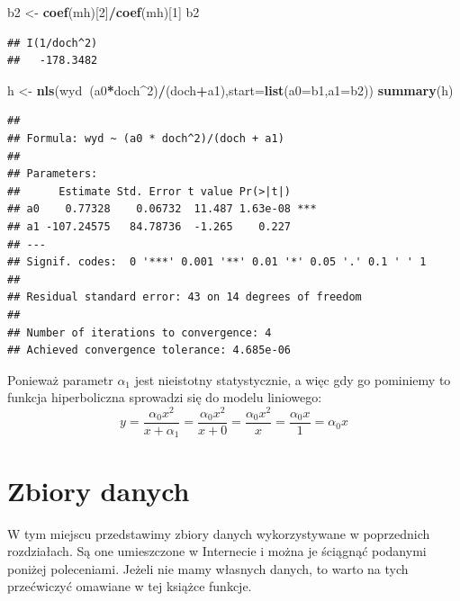 \documentclass[polish,]{book}
\newenvironment{Shaded}{\begin{snugshade}}{\end{snugshade}}
\newcommand{\DataTypeTok}[1]{\textcolor[rgb]{0.13,0.29,0.53}{#1}}
\newcommand{\DecValTok}[1]{\textcolor[rgb]{0.00,0.00,0.81}{#1}}
\newcommand{\KeywordTok}[1]{\textcolor[rgb]{0.13,0.29,0.53}{\textbf{#1}}}
\newcommand{\NormalTok}[1]{#1}
\newcommand{\OperatorTok}[1]{\textcolor[rgb]{0.81,0.36,0.00}{\textbf{#1}}}
\newcommand{\StringTok}[1]{\textcolor[rgb]{0.31,0.60,0.02}{#1}}
\begin{document}
\begin{Shaded}
\begin{Highlighting}[]
\NormalTok{b2 <-}\StringTok{ }\KeywordTok{coef}\NormalTok{(mh)[}\DecValTok{2}\NormalTok{]}\OperatorTok{/}\KeywordTok{coef}\NormalTok{(mh)[}\DecValTok{1}\NormalTok{]}
\NormalTok{b2}
\end{Highlighting}
\end{Shaded}

\begin{verbatim}
## I(1/doch^2) 
##   -178.3482
\end{verbatim}

\begin{Shaded}
\begin{Highlighting}[]
\NormalTok{h <-}\StringTok{ }\KeywordTok{nls}\NormalTok{(wyd}\OperatorTok{~}\NormalTok{(a0}\OperatorTok{*}\NormalTok{doch}\OperatorTok{^}\DecValTok{2}\NormalTok{)}\OperatorTok{/}\NormalTok{(doch}\OperatorTok{+}\NormalTok{a1),}\DataTypeTok{start=}\KeywordTok{list}\NormalTok{(}\DataTypeTok{a0=}\NormalTok{b1,}\DataTypeTok{a1=}\NormalTok{b2))}
\KeywordTok{summary}\NormalTok{(h)}
\end{Highlighting}
\end{Shaded}

\begin{verbatim}
## 
## Formula: wyd ~ (a0 * doch^2)/(doch + a1)
## 
## Parameters:
##      Estimate Std. Error t value Pr(>|t|)    
## a0    0.77328    0.06732  11.487 1.63e-08 ***
## a1 -107.24575   84.78736  -1.265    0.227    
## ---
## Signif. codes:  0 '***' 0.001 '**' 0.01 '*' 0.05 '.' 0.1 ' ' 1
## 
## Residual standard error: 43 on 14 degrees of freedom
## 
## Number of iterations to convergence: 4 
## Achieved convergence tolerance: 4.685e-06
\end{verbatim}

Ponieważ parametr \(\alpha_1\) jest nieistotny statystycznie, a więc gdy go pominiemy to funkcja hiperboliczna sprowadzi się do modelu liniowego:
\[
y=\frac{\alpha_0x^2}{x+\alpha_1}=\frac{\alpha_0x^2}{x+0}=\frac{\alpha_0x^2}{x}=\frac{\alpha_0x}{1}=\alpha_0x
\]

\hypertarget{part_14}{%
\chapter{Zbiory danych}\label{part_14}}

W tym miejscu przedstawimy zbiory danych wykorzystywane w poprzednich rozdziałach. Są one umieszczone w Internecie i można je ściągnąć podanymi poniżej
poleceniami. Jeżeli nie mamy własnych danych, to warto na tych przećwiczyć omawiane w tej książce funkcje.
\end{document}
